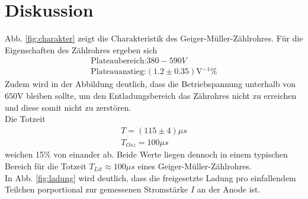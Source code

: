 \newpage
\section{Diskussion}
Abb. \ref{fig:charakter} zeigt die Charakteristik des Geiger-Müller-Zählrohres.
Für die Eigenschaften des Zählrohres ergeben sich 
\begin{align*}
    \text{Plateaubereich:}380-590\si{V}\\
    \text{Plateauanstieg:} (1.2\pm0.35)\si{\volt^{-1}}\%
\end{align*}
Zudem wird in der Abbildung deutlich, dass die Betriebspannung unterhalb von
$650$V bleiben sollte, um den Entladungsbereich das Zährohres nicht zu erreichen und
diese somit nicht zu zerstören.\\
Die Totzeit
\begin{align*}
    T=(115\pm4)\mu s\\
    T_{Osz}=100\mu s
\end{align*}
weichen 15\% von einander ab. Beide Werte liegen dennoch in einem
typischen Bereich für die Totzeit $T_{Lit}\approx 100\mu s$\cite{wiki} eines Geiger-Müller-Zählrohres.\\

In Abb. \ref{fig:ladung} wird deutlich, dass die freigesetzte Ladung pro einfallendem
Teilchen porportional zur gemessenen Stromstärke $I$ an der Anode ist.
